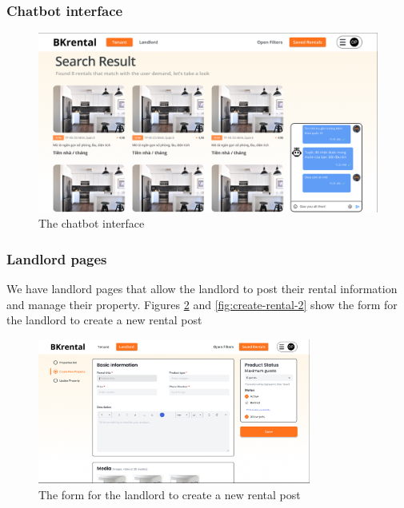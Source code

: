 \clearpage

\subsubsection{Chatbot interface}

\begin{figure}[ht]
    \centering
    \includegraphics[width=\textwidth]{Images/Mockup/chatbot.png}
    \caption{The chatbot interface}
    \label{fig:chatbot}
\end{figure}

\clearpage

\subsubsection{Landlord pages}
We have landlord pages that allow the landlord to post their rental information and manage their property. Figures \ref{fig:create-rental-1} and \ref{fig:create-rental-2} show the form for the landlord to create a new rental post

\begin{figure}[ht]
    \centering
    \includegraphics[width=0.8\textwidth]{Images/Mockup/create_rental_1.png}
    \caption{The form for the landlord to create a new rental post}
    \label{fig:create-rental-1}
\end{figure}

